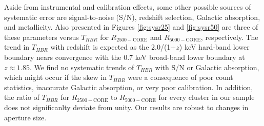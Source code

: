 \documentclass[12pt,preprint]{aastex}
\begin{document}
Aside from instrumental and calibration effects, some other possible
sources of systematic error are signal-to-noise (S/N), redshift
selection, Galactic absorption, and metallicity. Also presented in
Figures \ref{fig:sysr25} and \ref{fig:sysr50} are three of these
parameters versus $T_{HBR}$ for $R_{2500-\mathrm{CORE}}$ and
$R_{5000-\mathrm{CORE}}$, respectively. The trend in $T_{HBR}$ with
redshift is expected as the 2.0/(1+$z$) keV hard-band lower boundary
nears convergence with the 0.7 keV broad-band lower boundary at $z
\approx 1.85$. We find no systematic trends of $T_{HBR}$ with S/N or
Galactic absorption, which might occur if the skew in $T_{HBR}$ were a
consequence of poor count statistics, inaccurate Galactic absorption,
or very poor calibration. In addition, the ratio of $T_{HBR}$ for
$R_{2500-\mathrm{CORE}}$ to $R_{5000-\mathrm{CORE}}$ for every cluster
in our sample does not significanlty deviate from unity. Our results
are robust to changes in aperture size.
\end{document}
